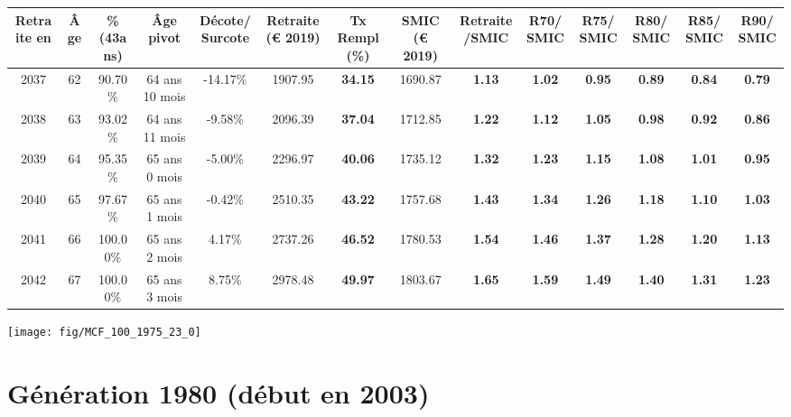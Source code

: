 \begin{adjustbox}{max width=\textwidth} 
\begin{tabular}[htb]{|c|c||c|c|c||c|c||c|c||c|c|c|c|c|} 
\hline 
 Retraite en &  Âge &  \%(43ans) &  Âge pivot &  Décote/Surcote &  Retraite (\euro{} 2019) &  Tx Rempl(\%) &  SMIC (\euro{} 2019) &  Retraite/SMIC &  R70/SMIC &  R75/SMIC &  R80/SMIC &  R85/SMIC &  R90/SMIC \\ 
\hline \hline 
 2037 &  62 &  90.70\% &  64 ans 10 mois &  -14.17\% &  1907.95 &  {\bf 34.15} &  1690.87 &  {\bf 1.13} &  {\bf 1.02} &  {\bf {\color{red} 0.95}} &  {\bf {\color{red} 0.89}} &  {\bf {\color{red} 0.84}} &  {\bf {\color{red} 0.79}} \\ 
\hline 
 2038 &  63 &  93.02\% &  64 ans 11 mois &  -9.58\% &  2096.39 &  {\bf 37.04} &  1712.85 &  {\bf 1.22} &  {\bf 1.12} &  {\bf 1.05} &  {\bf {\color{red} 0.98}} &  {\bf {\color{red} 0.92}} &  {\bf {\color{red} 0.86}} \\ 
\hline 
 2039 &  64 &  95.35\% &  65 ans 0 mois &  -5.00\% &  2296.97 &  {\bf 40.06} &  1735.12 &  {\bf 1.32} &  {\bf 1.23} &  {\bf 1.15} &  {\bf 1.08} &  {\bf 1.01} &  {\bf {\color{red} 0.95}} \\ 
\hline 
 2040 &  65 &  97.67\% &  65 ans 1 mois &  -0.42\% &  2510.35 &  {\bf 43.22} &  1757.68 &  {\bf 1.43} &  {\bf 1.34} &  {\bf 1.26} &  {\bf 1.18} &  {\bf 1.10} &  {\bf 1.03} \\ 
\hline 
 2041 &  66 &  100.00\% &  65 ans 2 mois &  4.17\% &  2737.26 &  {\bf 46.52} &  1780.53 &  {\bf 1.54} &  {\bf 1.46} &  {\bf 1.37} &  {\bf 1.28} &  {\bf 1.20} &  {\bf 1.13} \\ 
\hline 
 2042 &  67 &  100.00\% &  65 ans 3 mois &  8.75\% &  2978.48 &  {\bf 49.97} &  1803.67 &  {\bf 1.65} &  {\bf 1.59} &  {\bf 1.49} &  {\bf 1.40} &  {\bf 1.31} &  {\bf 1.23} \\ 
\hline 
\hline 
\end{tabular} 
\end{adjustbox} 
 
 \vspace{0.1cm} 

 {\hspace{-2.2cm}\texttt{[image: fig/MCF\_100\_1975\_23\_0]}} 

\newpage 
 
\section{Génération 1980 (début en 2003)\label{MCF_100_1980_23_0}} 
 
